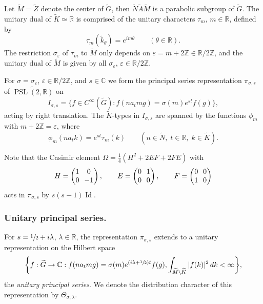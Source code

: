 \documentclass[10pt]{amsart}
\theoremstyle{plain}
\theoremstyle{definition}
\theoremstyle{remark}
\newcommand{\R}{\mathbb{R}}
\newcommand{\Z}{\mathbb{Z}}
\newcommand{\C}{\mathbb{C}}
\DeclareMathOperator{\PSL}{PSL}
\DeclareMathOperator{\Id}{Id}
\numberwithin{equation}{section}
\begin{document}
Let $\widetilde{M}=\widetilde{Z}$ denote the center of $\widetilde{G}$, then $\widetilde{N}\widetilde{A}\widetilde{M}$ is a parabolic subgroup of $\widetilde{G}$. The unitary dual of $\widetilde{K}\simeq\R$ is comprised of the unitary characters $\tau_m$, $m\in\R$, defined by
\begin{equation}
\tau_m(\widetilde{k}_\theta) = e^{im\theta} \qquad (\theta\in\R).\label{eq:DefTauM}
\end{equation}
The restriction $\sigma_\varepsilon$ of $\tau_m$ to $\widetilde{M}$ only depends on $\varepsilon=m+2\Z\in\R/2\Z$, and the unitary dual of $\widetilde{M}$ is given by all $\sigma_\varepsilon$, $\varepsilon\in\R/2\Z$.

For $\sigma=\sigma_\varepsilon$, $\varepsilon\in\R/2\Z$, and $s\in\C$ we form the principal series representation $\pi_{\sigma,s}$ of $\widetilde{\PSL(2,\R)}$ on
\[
I_{\sigma,s} = \{f\in C^\infty(\widetilde{G}):f(na_tmg)=\sigma(m)e^{st}f(g)\},
\]
acting by right translation. The $\widetilde{K}$-types in $I_{\sigma,s}$ are spanned by the functions $\phi_m$ with $m+2\Z=\varepsilon$, where
\[
\phi_m(na_tk) = e^{st}\tau_m(k) \qquad (n\in\widetilde{N},\;t\in\R,\;k\in\widetilde{K}).
\]

Note that the Casimir element $\Omega=\frac{1}{4}(H^2+2EF+2FE)$ with
\[\arraycolsep3.5pt
H=\begin{pmatrix}1&0\\0&-1\end{pmatrix}, \qquad E=\begin{pmatrix}0&1\\0&0\end{pmatrix}, \qquad F=\begin{pmatrix}0&0\\1&0\end{pmatrix}
\]
acts in $\pi_{\sigma,s}$ by $s(s-1)\Id$.

\subsubsection*{Unitary principal series.} For $s=\sfrac{1}{2}+i\lambda$, $\lambda\in\R$, the representation $\pi_{\sigma,s}$ extends to a unitary representation on the Hilbert space
\[
\biggl\{f:\widetilde{G}\rightarrow\C:f(na_tmg)=\sigma(m)e^{(i\lambda+\sfrac{1}{2})t}f(g),\int_{\widetilde{M}\backslash\widetilde{K}}|f(k)|^2\,dk<\infty\biggr\},
\]
the \emph{unitary principal series}. We denote the distribution character of this representation by $\Theta_{\sigma,\lambda}$.
\end{document}
